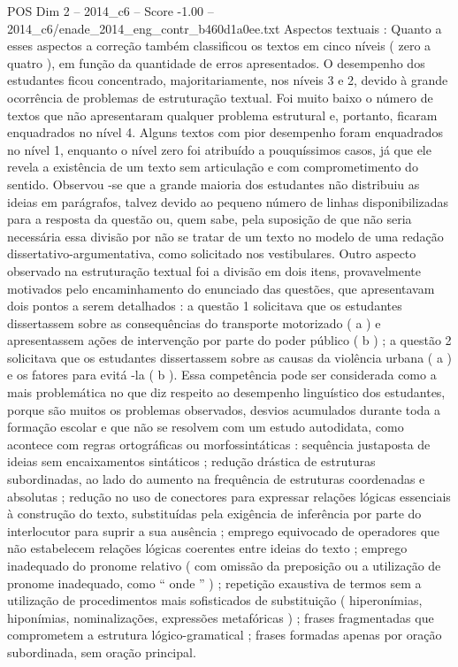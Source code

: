 \begin{textsample}{POS Dim 2 – 2014\_c6 – Score -1.00 – 2014\_c6/enade\_2014\_eng\_contr\_b460d1a0ee.txt}
Aspectos textuais : Quanto a esses aspectos a correção também classificou os textos em cinco níveis ( zero a quatro ), em função da quantidade de erros apresentados.
O desempenho dos estudantes ficou concentrado, majoritariamente, nos níveis 3 e 2, devido à grande ocorrência de problemas de estruturação textual.
Foi muito baixo o número de textos que não apresentaram qualquer problema estrutural e, portanto, ficaram enquadrados no nível 4.
Alguns textos com pior desempenho foram enquadrados no nível 1, enquanto o nível zero foi atribuído a pouquíssimos casos, já que ele revela a existência de um texto sem articulação e com comprometimento do sentido.
Observou -se que a grande maioria dos estudantes não distribuiu as ideias em parágrafos, talvez devido ao pequeno número de linhas disponibilizadas para a resposta da questão ou, quem sabe, pela suposição de que não seria necessária essa divisão por não se tratar de um texto no modelo de uma redação dissertativo-argumentativa, como solicitado nos vestibulares.
Outro aspecto observado na estruturação textual foi a divisão em dois itens, provavelmente motivados pelo encaminhamento do enunciado das questões, que apresentavam dois pontos a serem detalhados : a questão 1 solicitava que os estudantes dissertassem sobre as consequências do transporte motorizado ( a ) e apresentassem ações de intervenção por parte do poder público ( b ) ; a questão 2 solicitava que os estudantes dissertassem sobre as causas da violência urbana ( a ) e os fatores para evitá -la ( b ).
Essa competência pode ser considerada como a mais problemática no que diz respeito ao desempenho linguístico dos estudantes, porque são muitos os problemas observados, desvios acumulados durante toda a formação escolar e que não se resolvem com um estudo autodidata, como acontece com regras ortográficas ou morfossintáticas : sequência justaposta de ideias sem encaixamentos sintáticos ; redução drástica de estruturas subordinadas, ao lado do aumento na frequência de estruturas coordenadas e absolutas ; redução no uso de conectores para expressar relações lógicas essenciais à construção do texto, substituídas pela exigência de inferência por parte do interlocutor para suprir a sua ausência ; emprego equivocado de operadores que não estabelecem relações lógicas coerentes entre ideias do texto ; emprego inadequado do pronome relativo ( com omissão da preposição ou a utilização de pronome inadequado, como “ onde ” ) ; repetição exaustiva de termos sem a utilização de procedimentos mais sofisticados de substituição ( hiperonímias, hiponímias, nominalizações, expressões metafóricas ) ; frases fragmentadas que comprometem a estrutura lógico-gramatical ; frases formadas apenas por oração subordinada, sem oração principal.

\end{textsample}
